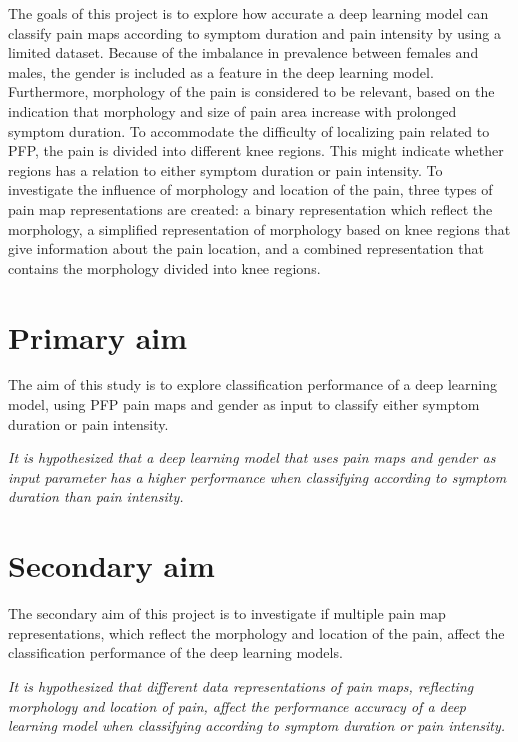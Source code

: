 \noindent
The goals of this project is to explore how accurate a deep learning model can classify pain maps according to symptom duration and pain intensity by using a limited dataset. Because of the imbalance in prevalence between females and males, the gender is included as a feature in the deep learning model. 
Furthermore, morphology of the pain is considered to be relevant, based on the indication that morphology and size of pain area increase with prolonged symptom duration. 
To accommodate the difficulty of localizing pain related to PFP, the pain is divided into different knee regions. This might indicate whether regions has a relation to either symptom duration or pain intensity.
\noindent
To investigate the influence of morphology and location of the pain, three types of pain map representations are created: a binary representation which reflect the morphology, a simplified representation of morphology based on knee regions that give information about the pain location, and a combined representation that contains the morphology divided into knee regions.   

\section{Primary aim}
The aim of this study is to explore classification performance of a deep learning model, using PFP pain maps and gender as input to classify either symptom duration or pain intensity. 
\vspace{4mm}
\noindent
\begin{center}
\textit{It is hypothesized that a deep learning model that uses pain maps and gender as input parameter has a higher performance when classifying according to symptom duration than pain intensity.}
\end{center}

\section{Secondary aim}
The secondary aim of this project is to investigate if multiple pain map representations, which reflect the morphology and location of the pain, affect the  classification performance of the deep learning models.

\vspace{4mm}
\noindent
\begin{center}
\textit{It is hypothesized that different data representations of pain maps, reflecting morphology and location of pain, affect the performance
accuracy of a deep learning model when classifying according to symptom duration or pain intensity.
}
\end{center}

